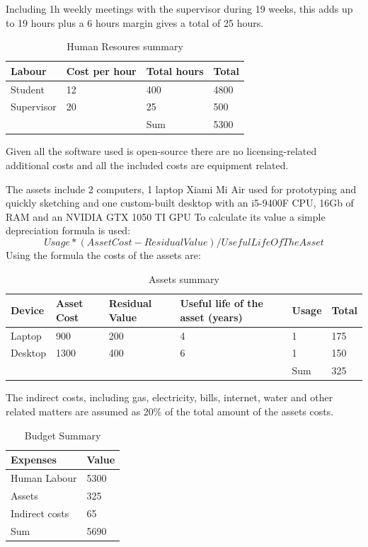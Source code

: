 Including 1h weekly meetings with the supervisor during 19 weeks, this adds up to 19 hours plus a 6 hours margin gives a total of 25 hours.

\begin{table}[h!]
    \centering
    \begin{tabular}{l l l l} 
        \hline
        Labour & Cost per hour & Total hours & Total \\ [0.5ex] 
        \hline
        Student & 12 & 400 & 4800 \\ 
        Supervisor & 20 & 25 & 500 \\
        \hline
        & & Sum & 5300 \\
        \hline
    \end{tabular}
    \caption{Human Resoures summary}
    \label{table:Human Resoures summary}
\end{table}

Given all the software used is open-source there are no licensing-related additional costs and all the included costs are equipment related.

The assets include 2 computers, 1 laptop Xiami Mi Air used for prototyping and quickly sketching and one custom-built desktop with an i5-9400F CPU, 16Gb of RAM and an NVIDIA GTX 1050 TI GPU 
To calculate its value a simple depreciation formula is used:
$$Usage *  (Asset Cost - Residual Value) / Useful Life Of The Asset$$
Using the formula the costs of the assets are:
\begin{table}[h!]
    \centering
    \begin{tabular}{l l l l l l} 
        \hline
        Device & Asset Cost & Residual Value & Useful life of the asset (years) & Usage & Total \\ [0.5ex] 
        \hline
        Laptop & 900 & 200 &  4 & 1 & 175 \\ 
        Desktop & 1300 & 400 & 6 & 1 & 150 \\
        \hline
        & & & & Sum & 325 \\
        \hline
    \end{tabular}
    \caption{Assets summary}
    \label{table:2}
\end{table}

The indirect costs, including gas, electricity, bills, internet, water and other related matters are assumed as 20\% of the total amount of the assets costs.

\begin{table}[h!]
    \centering
    \begin{tabular}{l l} 
        \hline
        Expenses & Value \\
        \hline
        Human Labour & 5300 \\ 
        Assets & 325 \\
	    Indirect costs & 65 \\
        \hline
        Sum & 5690 \\
        \hline
    \end{tabular}
    \caption{Budget Summary}
    \label{table:Budget Summary}
\end{table}
\newpage

